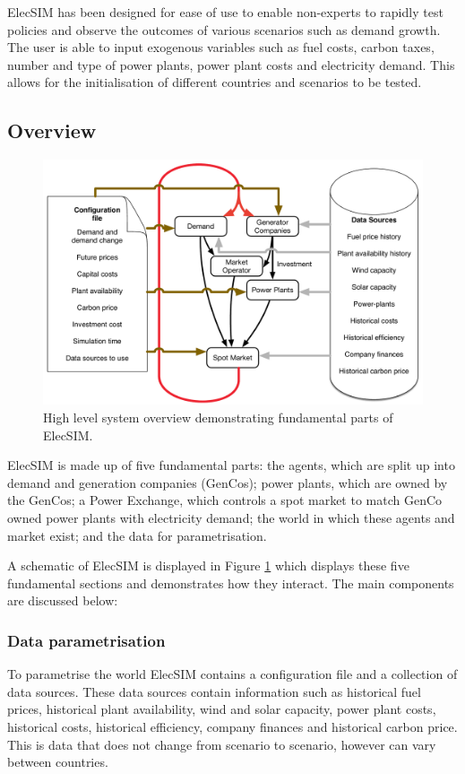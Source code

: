 
ElecSIM has been designed for ease of use to enable non-experts to rapidly test policies and observe the outcomes of various scenarios such as demand growth. The user is able to input exogenous variables such as fuel costs, carbon taxes, number and type of power plants, power plant costs and electricity demand. This allows for the initialisation of different countries and scenarios to be tested.


\subsection{Overview}

\begin{figure}
	\centering
	\includegraphics[width=0.97\linewidth]{figures/System_overview}
	\caption{High level system overview demonstrating fundamental parts of ElecSIM.}
	\label{fig:systemoverview}
\end{figure}




ElecSIM is made up of five fundamental parts: the agents, which are split up into demand and generation companies (GenCos); power plants, which are owned by the GenCos; a Power Exchange, which controls a spot market to match GenCo owned power plants with electricity demand; the world in which these agents and market exist; and the data for parametrisation.

A schematic of ElecSIM is displayed in Figure \ref{fig:systemoverview} which displays these five fundamental sections and demonstrates how they interact. The main components are discussed below:

\subsubsection{Data parametrisation} To parametrise the world ElecSIM contains a configuration file and a collection of data sources. These data sources contain information such as historical fuel prices, historical plant availability, wind and solar capacity, power plant costs, historical costs, historical efficiency, company finances and historical carbon price. This is data that does not change from scenario to scenario, however can vary between countries.

